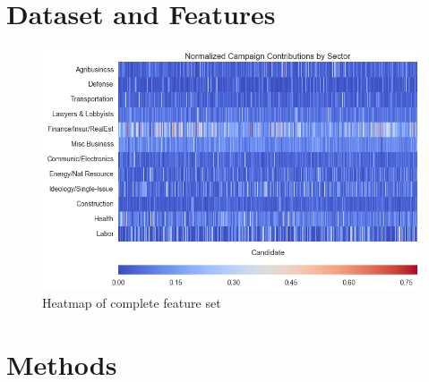 \documentclass[10]{article}
\begin{document}
\section*{Dataset and Features}

\begin{figure}[H]
\centering
\includegraphics[width=.8\textwidth]{cand_2010_2012_2014_fm_trim_normed_feature_hm.png}
\caption{\label{fig:pc_all}Heatmap of complete feature set}
\end{figure}

\section*{Methods}
\end{document}

